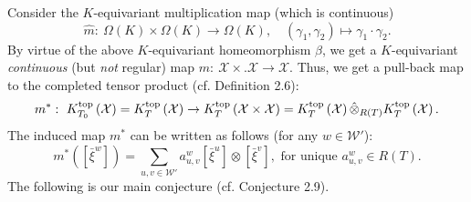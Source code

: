 \documentclass{article}
\def\X{\mathcal{X}}
\def\W{\mathcal{W}}
\def\ref#1{#1}
\def\top{\rm{top}}
\begin{document}
Consider the $K$-equivariant multiplication map (which is continuous) 
$$
\hat{m}:~\Omega (K) \times \Omega (K) \rightarrow \Omega (K), \quad \left( \gamma_1,  \gamma_2\right) \mapsto \gamma_1\cdot \gamma_2.
$$
By virtue of the above $K$-equivariant homeomorphism $\beta$, we get a $K$-equivariant {\it continuous} (but {\it not} regular) map 
$
m:~\X\times .\X \rightarrow \X.
$
Thus, we get a pull-back map to the completed tensor product (cf. Definition \ref{2.6}):
$$
m^*:~K^{\top}_{T_0}\left(\X\right) = K^{\top}_T \left(\X\right) \rightarrow K^{\top}_T \left(\X\times \X\right) = K_T^{\top} \left(\X\right) {\hat{\otimes}}_{R(T)} K_T^{\top} \left(\X\right).
$$
The induced map $m^*$
can be written as follows (for any $w\in\W'$):
$$
m^*\left(\left[\bar{\xi}^w\right]\right) = \sum_{u,v\in \W'} a^w _{u,v}\left[\bar{\xi}^u\right] \otimes\left [\bar{\xi}^v\right],\mbox{ for unique } a^w_{u,v}\in R(T).
$$
The following is our main conjecture (cf. Conjecture \ref{2.9}). 
\end{document}
